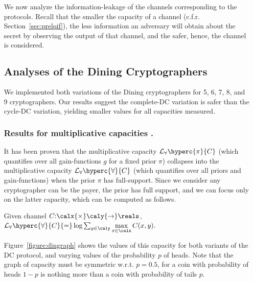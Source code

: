 We now analyze the information-leakage of the channels corresponding to the protocols.
Recall that the smaller the capacity of a channel (c.f.r. Section~\ref{sec:prelqif}), 
the less information an adversary will obtain about the secret by observing the 
output of that channel, and the safer, hence, the channel is considered.

\subsection{\label{sec:analdin} Analyses of the Dining Cryptographers}

We implemented both variations of the Dining cryptographers for 
5, 6, 7, 8, and 9 cryptographers. 
Our results suggest the complete-DC variation is safer than the cycle-DC variation, 
yielding smaller values for all capacities measured.

\subsubsection{Results for multiplicative capacities%
.}

It has been proven \cite{addmult} that the multiplicative capacity
$\mathcal{L}_\forall\hyperc{\pi}{C}$ (which quantifies over all gain-functions $g$ for
a fixed prior $\pi$) collapses into the multiplicative capacity 
$\mathcal{L}_\forall\hyperc{\forall}{C}$ (which quantifies over all priors and gain-functions)
when the prior $\pi$ has full-support. 
Since we consider any cryptographer can be the payer, the prior has full support, 
and we can focus only on the latter capacity, which can be computed as follows.

\begin{Theorem}
\label{capacity}
Given channel $C{:}\calx{\times}\caly{\rightarrow}\reals$,
$\mathcal{L}_\forall\hyperc{\forall}{C}{=}\log \sum_{y \in \caly}\max\limits_{x \in \calx} C(x,y).$
\end{Theorem}

Figure~\ref{figure:dingraph} shows the values of this capacity for both 
variants of the DC protocol, and varying values of the probability $p$ 
of heads. 
Note that the graph of capacity must be symmetric w.r.t. $p=0.5$, 
for a coin with probability of heads $1{-}p$ is nothing more than a 
coin with probability of tails $p$.

